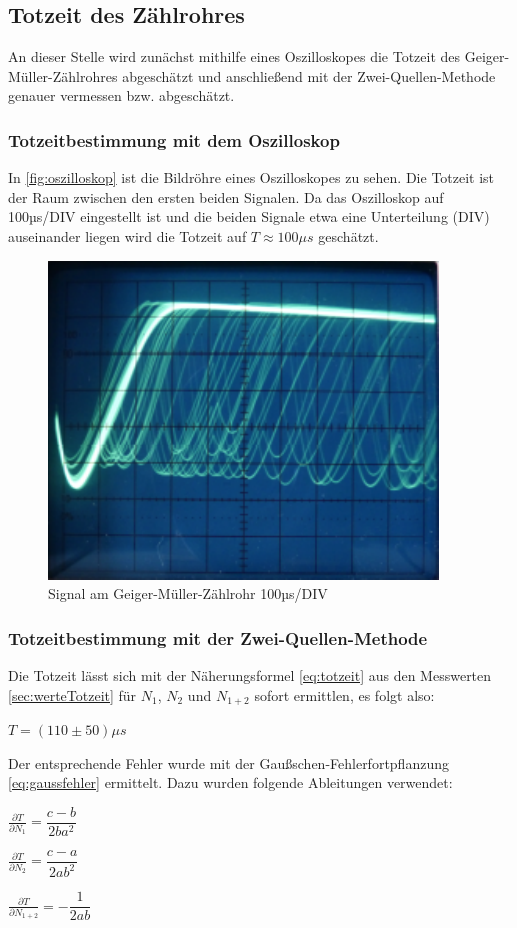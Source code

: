 \subsection{Totzeit des Zählrohres}
\label{sec:totzeit}
An dieser Stelle wird zunächst mithilfe eines Oszilloskopes die Totzeit des Geiger-Müller-Zählrohres
abgeschätzt und anschließend mit der Zwei-Quellen-Methode genauer vermessen bzw. abgeschätzt. 
\subsubsection{Totzeitbestimmung mit dem Oszilloskop}
\label{sec:totzeitO}
In \autoref{fig:oszilloskop} ist die Bildröhre eines Oszilloskopes zu sehen. Die Totzeit ist der Raum 
zwischen den ersten beiden Signalen. Da das Oszilloskop auf 100µs/DIV eingestellt ist und die beiden Signale 
etwa eine Unterteilung (DIV) auseinander liegen wird die Totzeit auf $T \approx 100\mu s$ geschätzt.
\begin{figure}
  \centering
  \includegraphics{oszilloskop.pdf}
  \caption{Signal am Geiger-Müller-Zählrohr 100µs/DIV}
  \label{fig:oszilloskop}
\end{figure}
\subsubsection{Totzeitbestimmung mit der Zwei-Quellen-Methode}
\label{sec:totzeitZ}
Die Totzeit lässt sich mit der Näherungsformel \autoref{eq:totzeit} aus den Messwerten 
\autoref{sec:werteTotzeit} für $N_1$, $N_2$ und $N_{1+2}$ sofort ermittlen, es folgt also:
\begin{center}
  $T=(110\pm50) \mu s$
\end{center}
Der entsprechende Fehler wurde mit der Gaußschen-Fehlerfortpflanzung \autoref{eq:gaussfehler} ermittelt.
Dazu wurden folgende Ableitungen verwendet:
\begin{center}
  $\frac{\partial T}{\partial N_1}=\dfrac{c-b}{2ba^2}$\\
\end{center}
\begin{center}
  $\frac{\partial T}{\partial N_2}=\dfrac{c-a}{2ab^2}$\\
\end{center}
\begin{center}
  $\frac{\partial T}{\partial N_{1+2}}=-\dfrac{1}{2ab}$
\end{center}

